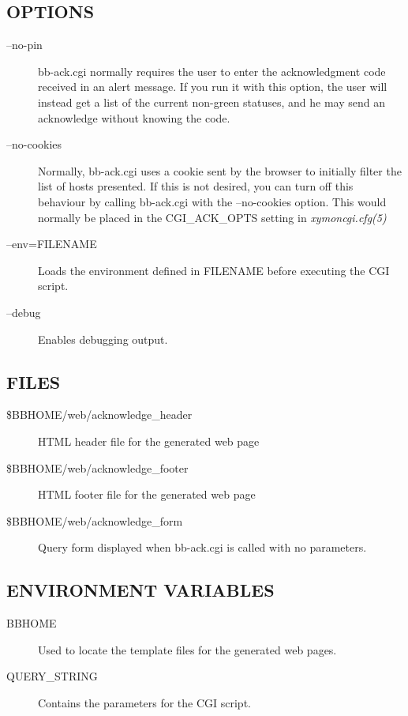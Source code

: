 \subsection{OPTIONS}
\begin{description}
\item[--no-pin] bb-ack.cgi normally requires the user to enter the
  acknowledgment code received in an alert message. If you run it with
  this option, the user will instead get a list of the current
  non-green statuses, and he may send an acknowledge without knowing
  the code. 


 

\item[--no-cookies] Normally, bb-ack.cgi uses a cookie sent by the
  browser to initially filter the list of hosts presented. If this is
  not desired, you can turn off this behaviour by calling bb-ack.cgi
  with the --no-cookies option. This would normally be placed in the
  CGI\_ACK\_OPTS setting in \emph{xymoncgi.cfg(5)}



 
\item[--env=FILENAME] Loads the environment defined in FILENAME before executing the CGI script. 

 

\item[--debug] Enables debugging output. 

 


\end{description}
\subsection{FILES}
\begin{description}
\item[\$BBHOME/web/acknowledge\_header] HTML header file for the generated web page 

 

\item[\$BBHOME/web/acknowledge\_footer] HTML footer file for the generated web page 

 

\item[\$BBHOME/web/acknowledge\_form] Query form displayed when bb-ack.cgi is called with no parameters. 

 
\end{description}
\subsection{ENVIRONMENT VARIABLES}
\begin{description}
\item[BBHOME] Used to locate the template files for the generated web pages. 

 

\item[QUERY\_STRING] Contains the parameters for the CGI script. 

 


\end{description}
